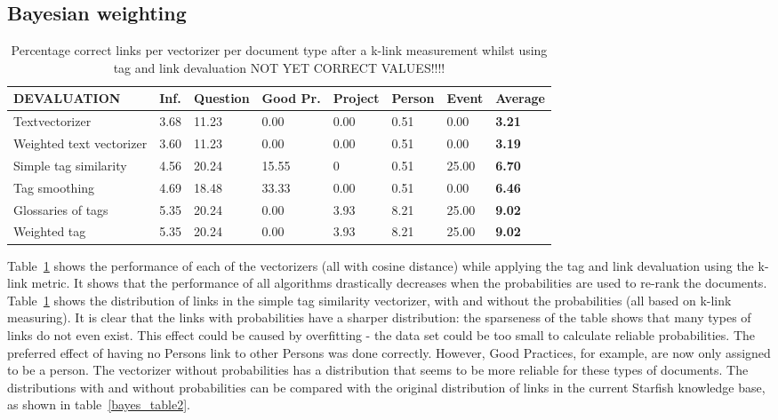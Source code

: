 \subsection{Bayesian weighting}
\begin{table}
\begin{tabular}{| l | l | l | l | l | l | l | l |}
\hline
DEVALUATION & Inf. &  Question &  Good Pr.& Project & Person &  Event & {\bf Average} \\
\hline
Textvectorizer & 3.68 & 11.23 & 0.00 & 0.00 & 0.51 & 0.00 & {\bf 3.21}\\
Weighted text vectorizer & 3.60 & 11.23 & 0.00 & 0.00 & 0.51 & 0.00 & {\bf 3.19} \\ 
Simple tag similarity & 4.56 & 20.24 & 15.55 & 0 & 0.51 & 25.00 & {\bf 6.70}\\
Tag smoothing & 4.69 & 18.48 & 33.33 & 0.00 & 0.51 & 0.00 & {\bf 6.46}\\
Glossaries of tags & 5.35 & 20.24 & 0.00 & 3.93 & 8.21 & 25.00 & {\bf 9.02}\\
Weighted tag & 5.35 & 20.24 & 0.00 & 3.93 & 8.21 & 25.00 & {\bf 9.02}\\
\hline
\end{tabular}
\caption{Percentage correct links per vectorizer per document type after a k-link measurement whilst using tag and link devaluation NOT YET CORRECT VALUES!!!!}
\label{bayes_table1}
\end{table}

Table~\ref{bayes_table1} shows the performance of each of the vectorizers (all
with cosine distance) while applying the tag and link devaluation using the
k-link metric. It shows that the performance of all algorithms drastically
decreases when the probabilities are used to re-rank the documents. 
Table~\ref{bayes_table1}  shows the distribution of links in the simple tag
similarity vectorizer, with and without the probabilities (all based on k-link
measuring). It is clear that the links with probabilities have a sharper
distribution: the sparseness of the table shows that many types of links do not
even exist. This effect could be caused by overfitting - the data set could be
too small to calculate reliable probabilities. The preferred effect of having no
Persons link to other Persons was done correctly. However, Good Practices, for
example, are now only assigned to be a person. The vectorizer without
probabilities has a distribution that seems to be more reliable for these types
of documents. The distributions with and without probabilities can be compared
with the original distribution of links in the current Starfish knowledge base,
as shown in table~\ref{bayes_table2}.  

